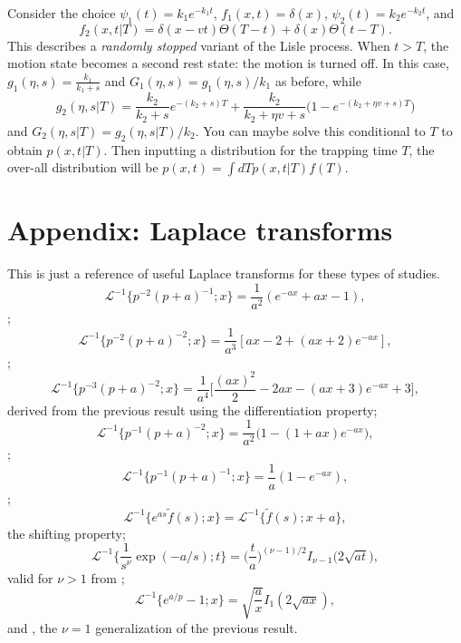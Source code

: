 \documentclass[11pt]{article}
\newcommand\be{\begin{equation}} %
\newcommand\ee{\end{equation}}   %
\newcommand\El{\mathcal{L}}
\begin{document}
Consider the choice $\psi_1(t) = k_1e^{-k_1t}$, $f_1(x,t)=\delta(x)$, $\psi_2(t) = k_2e^{-k_2t}$, and 
\be f_2(x,t|T) = \delta(x-vt)\Theta(T-t) + \delta(x)\Theta(t-T).\ee
This describes a \textit{randomly stopped} variant of the Lisle process.
When $t>T$, the motion state becomes a second rest state: the motion is turned off.
In this case, $g_1(\eta,s) = \frac{k_1}{k_1+s}$ and $G_1(\eta,s) = g_1(\eta,s)/k_1$ as before, while
\be g_2(\eta,s|T) = \frac{k_2}{k_2+s}e^{-(k_2+s)T} + \frac{k_2}{k_2 + \eta v + s}\Big(1-e^{-(k_2 + \eta v + s)T}\Big)\ee
and $G_2(\eta,s|T) = g_2(\eta,s|T)/k_2$.
You can maybe solve this conditional to $T$ to obtain $p(x,t|T)$.
Then inputting a distribution for the trapping time $T$, the over-all distribution will be $p(x,t) = \int dT p(x,t|T)f(T)$.


\section*{Appendix: Laplace transforms}
This is just a reference of useful Laplace transforms for these types of studies.
\be \El^{-1}\Big\{p^{-2}(p+a)^{-1};x\Big\} = \frac{1}{a^2}(e^{-ax}+ax-1),\ee
\citep[][2.1.2.33]{Prudnikov1986};
\be \El^{-1}\Big\{p^{-2}(p+a)^{-2};x\Big\} = \frac{1}{a^3}[ax - 2 + (ax+2)e^{-ax}],\ee
\citep[][2.1.2.49]{Prudnikov1986};
\be \El^{-1}\Big\{p^{-3}(p+a)^{-2};x\Big\} = \frac{1}{a^4}\Big[\frac{(ax)^2}{2} - 2ax - (ax+3)e^{-ax} + 3\Big], \ee
derived from the previous result using the differentiation property;
\be \El^{-1}\Big\{p^{-1}(p+a)^{-2};x\Big\} = \frac{1}{a^2}\Big(1 -(1+ax)e^{-ax}\Big),\ee
\citep[][2.1.2.47]{Prudnikov1986};
\be \El^{-1}\Big\{p^{-1}(p+a)^{-1};x\Big\} = \frac{1}{a}(1-e^{-ax}),\ee
\citep[][2.1.2.31]{Prudnikov1986};
\be\El^{-1} \{e^{as}\tilde{f}(s);x\} = \El^{-1}\{\tilde{f}(s);x+a\},\ee
the shifting property;
\be \El^{-1}\big\{\frac{1}{s^\nu}\exp(-a/s);t\} = \Big(\frac{t}{a}\Big)^{(\nu-1)/2}I_{\nu-1}\big(2\sqrt{a t}\big), \ee
valid for $\nu>1$ from \citep[][2.1.2.1]{Prudnikov1986};
\be \El^{-1}\{e^{a/p}-1;x\} = \sqrt{\frac{a}{x}}I_1(2\sqrt{ax}),\ee
and \citep[][2.1.2.8]{Prudnikov1986}, the $\nu=1$ generalization of the previous result.

\end{document}
